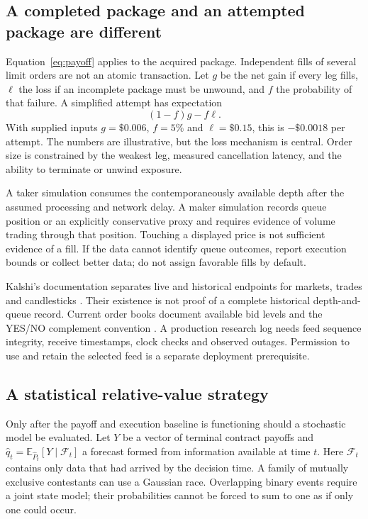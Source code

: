 \documentclass[11pt]{article}
\newcommand{\E}{\mathbb E}
\theoremstyle{remark}\newtheorem{example}{Example}
\begin{document}
\subsection{A completed package and an attempted package are different}
Equation~\eqref{eq:payoff} applies to the acquired package. Independent fills
of several limit orders are not an atomic transaction. Let $g$ be the net gain
if every leg fills, $\ell$ the loss if an incomplete package must be unwound,
and $f$ the probability of that failure. A simplified attempt has expectation
\begin{equation}\label{eq:legging}
 (1-f)g-f\ell.
\end{equation}
With supplied inputs $g=\$0.006$, $f=5\%$ and $\ell=\$0.15$, this is
$-\$0.0018$ per attempt. The numbers are illustrative, but the loss mechanism
is central. Order size is constrained by the weakest leg, measured cancellation
latency, and the ability to terminate or unwind exposure.

A taker simulation consumes the contemporaneously available depth after the
assumed processing and network delay. A maker simulation records queue
position or an explicitly conservative proxy and requires evidence of volume
trading through that position. Touching a displayed price is not sufficient
evidence of a fill. If the data cannot identify queue outcomes, report execution
bounds or collect better data; do not assign favorable fills by default.

Kalshi's documentation separates live and historical endpoints for markets,
trades and candlesticks \citep{kalshihistory}. Their existence is not proof of a
complete historical depth-and-queue record. Current order books document
available bid levels and the YES/NO complement convention \citep{kalshibook}.
A production research log needs feed sequence integrity, receive timestamps,
clock checks and observed outages. Permission to use and retain the selected
feed is a separate deployment prerequisite.

\subsection{A statistical relative-value strategy}
Only after the payoff and execution baseline is functioning should a stochastic
model be evaluated. Let $Y$ be a vector of terminal contract payoffs and
$\widehat q_t=\E_{\widehat P_t}[Y\mid\mathcal F_t]$ a forecast formed from
information available at time $t$. Here $\mathcal F_t$ contains only data that
had arrived by the decision time. A family of mutually exclusive contestants
can use a Gaussian race. Overlapping binary events require a joint state model;
their probabilities cannot be forced to sum to one as if only one could occur.
\end{document}

